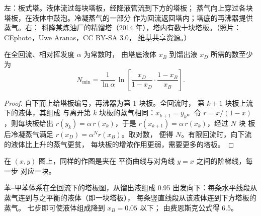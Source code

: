\begin{omfigure}
{\small 左：板式塔。液体流过每块塔板，经降液管流到下方的塔板；
蒸气向上穿过各块塔板，在液体中鼓泡。冷凝蒸气的一部分
作为回流返回塔内；塔底的再沸器提供蒸气。右：
科隆某炼油厂的精馏塔（2014 年），塔内有数十块塔板。（照片：
CEphoto，Uwe Aranas，CC BY-SA 3.0，
维基共享资源。）}
\end{omfigure}

\begin{proposition}[费恩斯克]\label{prop:b2:liquid-vapour-diagrams:fenske}
在全回流、相对挥发度 $\alpha$ 为常数时，
由塔底液体 $x_B$ 到馏出液
$x_D$ 所需的数至少为
\[
  N_{\min} = \frac{1}{\ln\alpha}\,\ln\!\left[\frac{x_D}{1 - x_D}\cdot\frac{1 - x_B}{x_B}\right] .
\]
\end{proposition}

\begin{proof}
自下而上给塔板编号，再沸器为第 1 块板。全回流时，
第 $k + 1$ 块板上流下的液体，其组成
与离开第 $k$ 块板的蒸气相同：$x_{k+1} = y_k$。令 $r = x/(1 - x)$，则每块板给出
$r(y_k) = \alpha\,r(x_k)$，于是 $r(x_{k+1}) = \alpha\,r(x_k)$，经过 $N$ 块
板后冷凝蒸气满足 $r(x_D) = \alpha^N r(x_B)$。取对数，
便得 $N$。有限回流时，向下流的液体比上升的蒸气更贫，
每块板的增浓作用更弱，需要更多的塔板。
\end{proof}

在 $(x, y)$ 图上，同样的作图是夹在
平衡曲线与对角线 $y = x$ 之间的阶梯线，每一步
对应一块。

\begin{omfigure}

{\small 苯–甲苯体系在全回流下的塔板图，从馏出液组成
0.95 出发向下：每条水平线段从蒸气连到与之平衡的液体（即一块塔板），
每条竖直线段从该液体连到下方塔板的蒸气。
七步即可使液体组成降到 $x_B = 0.05$ 以下；
由费恩斯克公式得 6.5。}
\end{omfigure}

